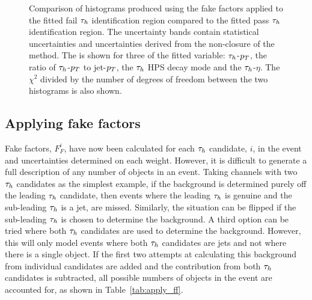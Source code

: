 \begin{figure}[!hbtp]
\caption[Plots of the validation of the ML fake factor fits.]{Comparison of histograms produced using the fake factors applied to the fitted fail $\tau_{h}$ identification region compared to the fitted pass $\tau_{h}$ identification region. The uncertainty bands contain statistical uncertainties and uncertainties derived from the non-closure of the method. The is shown for three of the fitted variable: $\tau_{h}$-$p_{T}$, the ratio of $\tau_{h}$-$p_{T}$ to jet-$p_{T}$, the $\tau_{h}$ HPS decay mode and the $\tau_{h}$-$\eta$. The $\chi^2$ divided by the number of degrees of freedom between the two histograms is also shown.}
\label{fig:4tau_ff_closure}
\end{figure}

\subsection{Applying fake factors}

Fake factors, $F_{F}^{i}$, have now been calculated for each $\tau_{h}$ candidate, $i$, in the event and uncertainties determined on each weight. 
However, it is difficult to generate a full description of any number of \jtth objects in an event.
Taking channels with two $\tau_{h}$ candidates as the simplest example, if the \jtth background is determined purely off the leading $\tau_{h}$ candidate, then events where the leading $\tau_{h}$ is genuine and the sub-leading $\tau_{h}$ is a jet, are missed.
Similarly, the situation can be flipped if the sub-leading $\tau_{h}$ is chosen to determine the \jtth background.
A third option can be tried where both $\tau_{h}$ candidates are used to determine the background.
However, this will only model events where both $\tau_{h}$ candidates are jets and not where there is a single \jtth object. 
If the first two attempts at calculating this background from individual candidates are added and the contribution from both $\tau_{h}$ candidates is subtracted, all possible numbers of \jtth objects in the event are accounted for, as shown in Table~\ref{tab:apply_ff}. \\

